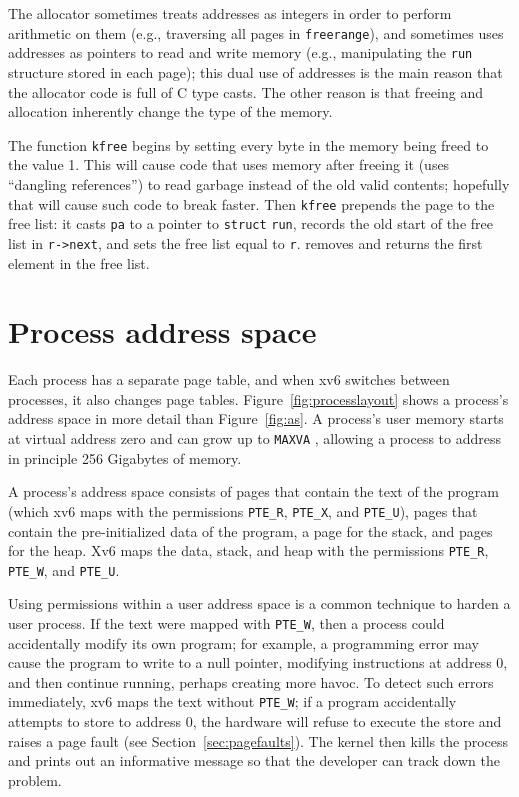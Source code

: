 The allocator sometimes treats addresses as integers
in order to perform arithmetic on them (e.g.,
traversing all pages in
\lstinline{freerange}),
and sometimes uses addresses as pointers to read and
write memory (e.g., manipulating the
\lstinline{run}
structure stored in each page);
this dual use of addresses is the main reason that the
allocator code is full of C type casts.
The other reason is that freeing and allocation inherently
change the type of the memory.

The function
\lstinline{kfree}
begins by setting every byte in the
memory being freed to the value 1.
This will cause code that uses memory after freeing it
(uses ``dangling references'')
to read garbage instead of the old valid contents;
hopefully that will cause such code to break faster.
Then
\lstinline{kfree}
prepends the page to the free list:
it casts
\lstinline{pa}
to a pointer to
\lstinline{struct}
\lstinline{run},
records the old start of the free list in
\lstinline{r->next},
and sets the free list equal to
\lstinline{r}.
removes and returns the first element in the free list.

\section{Process address space}

Each process has a separate page table, and when xv6 switches between
processes, it also changes page tables.
Figure~\ref{fig:processlayout} shows a process's address space in more
detail than Figure~\ref{fig:as}.  A process's user memory starts at
virtual address zero and can grow up to \texttt{MAXVA}
, allowing a process to address in
principle 256 Gigabytes of memory.

A process's address space consists of pages that contain the text of
the program (which xv6 maps with the permissions \lstinline{PTE_R},
\lstinline{PTE_X}, and \lstinline{PTE_U}), pages that contain the
pre-initialized data of the program, a page for the stack, and pages
for the heap.  Xv6 maps the data, stack, and heap with the permissions
\lstinline{PTE_R}, \lstinline{PTE_W}, and \lstinline{PTE_U}.

Using permissions within a user address space is a common technique to
harden a user process.  If the text were mapped with
\lstinline{PTE_W}, then a process could accidentally modify its own
program; for example, a programming error may cause the program to
write to a null pointer, modifying instructions at address 0, and then
continue running, perhaps creating more havoc.  To detect such errors
immediately, xv6 maps the text without \lstinline{PTE_W}; if a program
accidentally attempts to store to address 0, the hardware will refuse
to execute the store and raises a page fault (see
Section~\ref{sec:pagefaults}).  The kernel then kills the process and
prints out an informative message so that the developer can track down
the problem.

